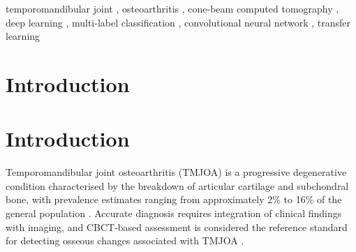 \documentclass[review,12pt]{elsarticle}
\begin{document}
\begin{frontmatter}
\begin{abstract}
\textbf{Conclusions:}
The proposed pipeline enables fully automated, clinician-level multi-label
TMJOA classification from CBCT with no manual landmark selection.
ConvNeXt-Large with informativeness-weighted slice sampling represents a
strong baseline for clinical translation.

\textbf{Clinical Significance:}
This system reduces the annotation burden from bounding-box-level
localisation to image-level labels while achieving robust multi-label
classification, facilitating large-scale screening and reproducible
computer-aided diagnosis of TMJOA.
\end{abstract}

\begin{keyword}
temporomandibular joint \sep
osteoarthritis \sep
cone-beam computed tomography \sep
deep learning \sep
multi-label classification \sep
convolutional neural network \sep
transfer learning
\end{keyword}

\end{frontmatter}

\linenumbers

\section{Introduction}
\label{sec:intro}

\section{Introduction}

Temporomandibular joint osteoarthritis (TMJOA) is a progressive
degenerative condition characterised by the breakdown of articular
cartilage and subchondral bone, with prevalence estimates ranging from approximately 2\% to 16\% of the general population
\cite{Xu2025bibliometric}. Accurate diagnosis requires integration of clinical findings with imaging, and CBCT-based assessment is considered the reference standard for detecting osseous changes associated with TMJOA
\cite{ahmad2009research,schiffman2014diagnostic}.
\end{document}
